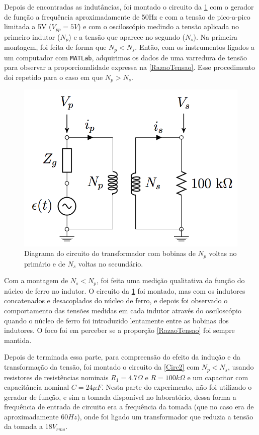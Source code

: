 \documentclass[11pt,a4paper]{article}
\begin{document}
	Depois de encontradas as indutâncias, foi montado o circuito da \cref{Circ1} com o gerador de função a frequência aproximadamente de 50Hz e com a tensão de pico-a-pico limitada a 5V ($V_{pp}=5V$) e com o osciloscópio medindo a tensão aplicada no primeiro indutor ($N_p$) e a tensão que aparece no segundo ($N_s$).
	Na primeira montagem, foi feita de forma que $N_p < N_s$. Então, com os instrumentos ligados a um computador com \texttt{MATLab}, adquirimos os dados de uma varredura de tensão para observar a proporcionalidade expressa na \cref{RazaoTensao}.
	Esse procedimento doi repetido para o caso em que $N_p > N _s$.
	
    \begin{figure}[!htb]
    \centering
    \includegraphics[scale=0.25]{Circ1.pdf}
    \caption{Diagrama do circuito do transformador com bobinas de $N_p$ voltas no primário e de $N_s$ voltas no secundário.}
    \label{Circ1}
    \end{figure}

	Com a montagem de $N_s < N_p$, foi feita uma medição qualitativa da função do núcleo de ferro no indutor. O circuito da \cref{Circ1} foi montado, mas com os indutores concatenados e desacoplados do núcleo de ferro, e depois foi observado o comportamento das tensões medidas em cada indutor através do osciloscópio quando o núcleo de ferro foi introduzido lentamente entre as bobinas dos indutores. O foco foi em perceber se a proporção \cref{RazaoTensao} foi sempre mantida.

	Depois de terminada essa parte, para compreensão do efeito da indução e da transformação da tensão, foi montado o circuito da \cref{Circ2} com $N_p < N_s$, usando resistores de resistências nominais $R_1 = 4.7\Omega$ e $R=100k\Omega$ e um capacitor com capacitância nominal $C=24\mu F$. Nesta parte do experimento, não foi utilizado o gerador de função, e sim a tomada disponível no laboratório, dessa forma a frequência de entrada de circuito era a frequência da tomada (que no caso era de aproximadamente $60Hz$), onde foi ligado um transformador que reduzia a tensão da tomada a $18V_{rms}$.
	
\end{document}
